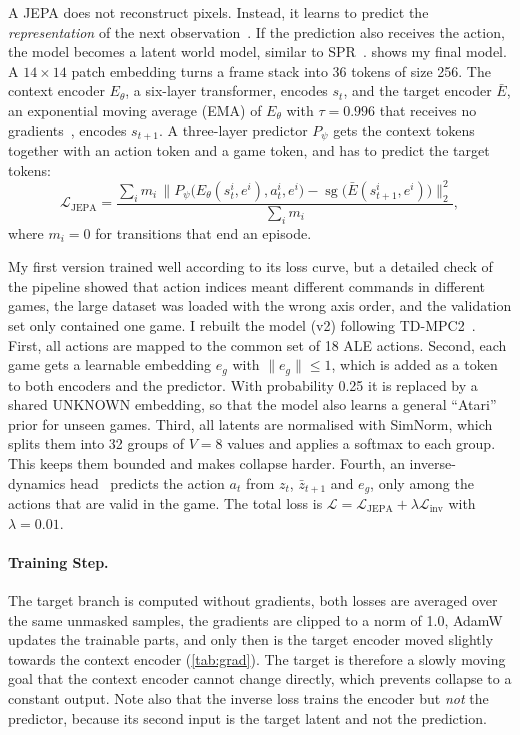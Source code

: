 \documentclass[runningheads]{llncs}
\begin{document}
A JEPA does not reconstruct pixels. Instead, it learns to predict the \emph{representation}
of the next observation~\cite{lecun2022path}. If the prediction also receives the action, the
model becomes a latent world model, similar to SPR~\cite{schwarzer2021spr}. 
shows my final model. A $14\times14$ patch embedding turns a frame stack into 36 tokens of
size 256. The context encoder $E_\theta$, a six-layer transformer, encodes $s_t$, and the
target encoder $\bar E$, an exponential moving average (EMA) of $E_\theta$ with $\tau=0.996$
that receives no gradients~\cite{assran2023ijepa}, encodes $s_{t+1}$. A three-layer predictor
$P_\psi$ gets the context tokens together with an action token and a game token, and has to
predict the target tokens:
\begin{equation}
  \mathcal{L}_{\text{JEPA}}=\frac{\sum_i m_i\,\big\|P_\psi\big(E_\theta(s_t^i,e^i),a_t^i,e^i\big)
  -\operatorname{sg}\big(\bar E(s_{t+1}^i,e^i)\big)\big\|_2^2}{\sum_i m_i},
\end{equation}
where $m_i=0$ for transitions that end an episode.

My first version trained well according to its loss curve, but a detailed check of the
pipeline showed that action indices meant different commands in different games, the large
dataset was loaded with the wrong axis order, and the validation set only contained one game.
I rebuilt the model (v2) following TD-MPC2~\cite{hansen2024tdmpc2}. First, all actions are mapped to the common set of 18 ALE
actions. Second, each game gets a learnable embedding $e_g$ with $\|e_g\|\le1$, which is added
as a token to both encoders and the predictor. With probability 0.25 it is replaced by a shared
UNKNOWN embedding, so that the model also learns a general ``Atari'' prior for unseen games.
Third, all latents are normalised with SimNorm, which splits them into 32 groups of $V=8$ values
and applies a softmax to each group. This keeps them bounded and makes collapse harder. Fourth,
an inverse-dynamics head~\cite{pathak2017icm} predicts the action $a_t$ from $z_t$,
$\bar z_{t+1}$ and $e_g$, only among the actions that are valid in the game. The total loss is
$\mathcal{L}=\mathcal{L}_{\text{JEPA}}+\lambda\mathcal{L}_{\text{inv}}$ with $\lambda=0.01$.

\paragraph{Training Step.} The target branch is computed without gradients, both losses are
averaged over the same unmasked samples, the gradients are clipped to a norm of 1.0, AdamW
updates the trainable parts, and only then is the target encoder moved slightly towards the
context encoder (\cref{tab:grad}). The target is therefore a slowly moving goal that the context
encoder cannot change directly, which prevents collapse to a constant output. Note also that
the inverse loss trains the encoder but \emph{not} the predictor, because its second input is
the target latent and not the prediction.
\end{document}
